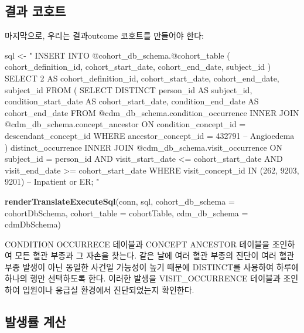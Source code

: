 \documentclass[10.5pt]{book}
\newenvironment{Shaded}{\begin{snugshade}}{\end{snugshade}}
\newcommand{\KeywordTok}[1]{\textcolor[rgb]{0.13,0.29,0.53}{\textbf{#1}}}
\newcommand{\DataTypeTok}[1]{\textcolor[rgb]{0.13,0.29,0.53}{#1}}
\newcommand{\StringTok}[1]{\textcolor[rgb]{0.31,0.60,0.02}{#1}}
\newcommand{\NormalTok}[1]{#1}
\theoremstyle{definition}
\theoremstyle{definition}
\theoremstyle{definition}
\theoremstyle{remark}
\begin{document}
\subsection{결과 코호트}\label{-}

마지막으로, 우리는 결과outcome 코호트를 만들어야 한다:

\begin{Shaded}
\begin{Highlighting}[]
\NormalTok{sql <-}\StringTok{ "}
\StringTok{INSERT INTO @cohort_db_schema.@cohort_table (}
\StringTok{ cohort_definition_id,}
\StringTok{ cohort_start_date,}
\StringTok{ cohort_end_date,}
\StringTok{subject_id}
\StringTok{)}
\StringTok{SELECT 2 AS cohort_definition_id,}
\StringTok{  cohort_start_date,}
\StringTok{  cohort_end_date,}
\StringTok{  subject_id}
\StringTok{FROM (}
\StringTok{  SELECT DISTINCT person_id AS subject_id,}
\StringTok{    condition_start_date AS cohort_start_date,}
\StringTok{    condition_end_date AS cohort_end_date}
\StringTok{  FROM @cdm_db_schema.condition_occurrence}
\StringTok{  INNER JOIN @cdm_db_schema.concept_ancestor}
\StringTok{    ON condition_concept_id = descendant_concept_id}
\StringTok{  WHERE ancestor_concept_id = 432791 -- Angioedema}
\StringTok{) distinct_occurrence}
\StringTok{INNER JOIN @cdm_db_schema.visit_occurrence}
\StringTok{  ON subject_id = person_id}
\StringTok{  AND visit_start_date <= cohort_start_date}
\StringTok{  AND visit_end_date >= cohort_start_date}
\StringTok{WHERE visit_concept_id IN (262, 9203,}
\StringTok{    9201) -- Inpatient or ER;}
\StringTok{"}

\KeywordTok{renderTranslateExecuteSql}\NormalTok{(conn, sql,}
                          \DataTypeTok{cohort_db_schema =}\NormalTok{ cohortDbSchema,}
                          \DataTypeTok{cohort_table =}\NormalTok{ cohortTable,}
                          \DataTypeTok{cdm_db_schema =}\NormalTok{ cdmDbSchema)}
\end{Highlighting}
\end{Shaded}

CONDITION OCCURRECE 테이블과 CONCEPT ANCESTOR 테이블을 조인하여 모든
혈관 부종과 그 자손을 찾는다. 같은 날에 여러 혈관 부종의 진단이 여러
혈관 부종 발생이 아닌 동일한 사건일 가능성이 높기 때문에 DISTINCT를
사용하여 하루에 하나의 행만 선택하도록 한다. 이러한 발생을
VISIT\_OCCURRENCE 테이블과 조인하여 입원이나 응급실 환경에서
진단되었는지 확인한다.

\subsection{발생률 계산}\label{-}
\end{document}
